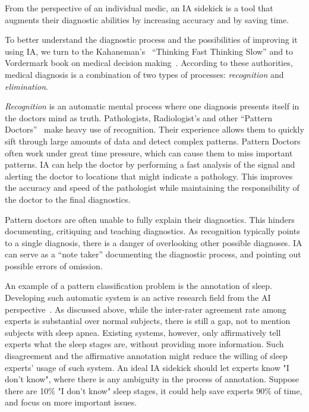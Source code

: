\documentclass[11pt]{pnas-new}
\begin{document}
 
From the perspective of an individual medic, an IA sidekick is a
tool that augments their diagnostic abilities by increasing accuracy
and by saving time.

To better understand the diagnostic process and the possibilities  of
improving it using IA, we turn to the Kahaneman's~\cite{kahneman2011thinking}
``Thinking Fast Thinking Slow'' and to Vordermark book on medical
decision making~\cite{vordermark2019introduction}. According to these authorities,
medical diagnosis is a combination of two types of processes: {\em
  recognition} and {\em elimination}.

{\em Recognition} is an automatic mental process where one diagnosis
presents itself in the doctors mind as truth. Pathologists,
Radiologist's and other ``Pattern Doctors''~\cite{topol2019deep} make heavy use
of recognition. Their experience allows them to quickly sift through
large amounts of data and detect complex patterns. Pattern Doctors
often work under great time pressure, which can cause them to miss
important patterns. IA can help the doctor by performing a fast
analysis of the signal and alerting the doctor to locations that might
indicate a pathology. This improves the accuracy and speed of the
pathologist while maintaining the responsibility of the doctor to the
final diagnostics. 

Pattern doctors are often unable to fully explain their diagnostics.
This hinders documenting, critiquing and teaching diagnostics. As
recognition typically points to a single diagnosis, there is a danger
of overlooking other possible diagnoses. IA can serve as a ``note
taker'' documenting the diagnostic process, and pointing out possible
errors of omission. 

An example of a pattern classification problem is the annotation of
sleep. Developing such automatic system is an
active research field from the AI perspective~\cite{HTaddCite}. As discussed above,
while the inter-rater agreement rate among experts is substantial over
normal subjects, there is still a gap, not to mention subjects with
sleep apnea. Existing systems, however, only affirmatively tell
experts what the sleep stages are, without providing more
information. Such disagreement and the affirmative annotation might
reduce the willing of sleep experts' usage of such system. An ideal IA
sidekick should let experts know "I don't know", where there is any
ambiguity in the process of annotation. Suppose there are 10\% "I
don't know" sleep stages, it could help save experts 90\% of time, and
focus on more important issues.
\end{document}
